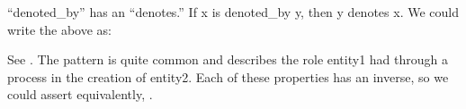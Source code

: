 \documentclass[letterpaper,10pt,english]{sphinxmanual}
\begin{document}
\begin{sphinxVerbatim}[commandchars=\\\{\}]
  
  
  
\end{sphinxVerbatim}

\sphinxAtStartPar
“denoted\_by” has an  “denotes.”  If x is denoted\_by y, then y denotes x.
We could write the above as:

\begin{sphinxVerbatim}[commandchars=\\\{\}]
  
  
  
\end{sphinxVerbatim}

\sphinxAtStartPar
See {\hyperref[\detokenize{locations:table-14}]{}}. The pattern  is quite common and describes the role entity1 had through a process
in
the creation of entity2. Each of these properties has an inverse, so we could assert
equivalently, .
\end{document}
